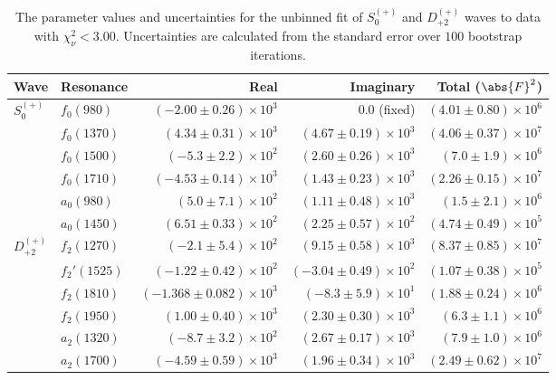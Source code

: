 \begin{table}[ht]
    \begin{center}
        \begin{tabular}{llrrr}\toprule
        Wave & Resonance & Real & Imaginary & Total ($\abs{F}^2$) \\\midrule
$S_{0}^{(+)}$ & $f_{0}(980)$ & $(-2.00 \pm 0.26) \times 10^{3}$ & $0.0$ (fixed) & $(4.01 \pm 0.80) \times 10^{6}$ \\
 & $f_{0}(1370)$ & $(4.34 \pm 0.31) \times 10^{3}$ & $(4.67 \pm 0.19) \times 10^{3}$ & $(4.06 \pm 0.37) \times 10^{7}$ \\
 & $f_{0}(1500)$ & $(-5.3 \pm 2.2) \times 10^{2}$ & $(2.60 \pm 0.26) \times 10^{3}$ & $(7.0 \pm 1.9) \times 10^{6}$ \\
 & $f_{0}(1710)$ & $(-4.53 \pm 0.14) \times 10^{3}$ & $(1.43 \pm 0.23) \times 10^{3}$ & $(2.26 \pm 0.15) \times 10^{7}$ \\
 & $a_{0}(980)$ & $(5.0 \pm 7.1) \times 10^{2}$ & $(1.11 \pm 0.48) \times 10^{3}$ & $(1.5 \pm 2.1) \times 10^{6}$ \\
 & $a_{0}(1450)$ & $(6.51 \pm 0.33) \times 10^{2}$ & $(2.25 \pm 0.57) \times 10^{2}$ & $(4.74 \pm 0.49) \times 10^{5}$ \\
$D_{+2}^{(+)}$ & $f_{2}(1270)$ & $(-2.1 \pm 5.4) \times 10^{2}$ & $(9.15 \pm 0.58) \times 10^{3}$ & $(8.37 \pm 0.85) \times 10^{7}$ \\
 & $f_{2}'(1525)$ & $(-1.22 \pm 0.42) \times 10^{2}$ & $(-3.04 \pm 0.49) \times 10^{2}$ & $(1.07 \pm 0.38) \times 10^{5}$ \\
 & $f_{2}(1810)$ & $(-1.368 \pm 0.082) \times 10^{3}$ & $(-8.3 \pm 5.9) \times 10^{1}$ & $(1.88 \pm 0.24) \times 10^{6}$ \\
 & $f_{2}(1950)$ & $(1.00 \pm 0.40) \times 10^{3}$ & $(2.30 \pm 0.30) \times 10^{3}$ & $(6.3 \pm 1.1) \times 10^{6}$ \\
 & $a_{2}(1320)$ & $(-8.7 \pm 3.2) \times 10^{2}$ & $(2.67 \pm 0.17) \times 10^{3}$ & $(7.9 \pm 1.0) \times 10^{6}$ \\
 & $a_{2}(1700)$ & $(-4.59 \pm 0.59) \times 10^{3}$ & $(1.96 \pm 0.34) \times 10^{3}$ & $(2.49 \pm 0.62) \times 10^{7}$ \\\bottomrule
        \end{tabular}
    \caption{The parameter values and uncertainties for the unbinned fit of $S_{0}^{(+)}$ and $D_{+2}^{(+)}$ waves to data with $\chi^2_\nu < 3.00$. Uncertainties are calculated from the standard error over $100$ bootstrap iterations.}\label{tab:unbinned-fit-chisqdof-3.0-Sp0p-Dp2p}
    \end{center}
\end{table}

